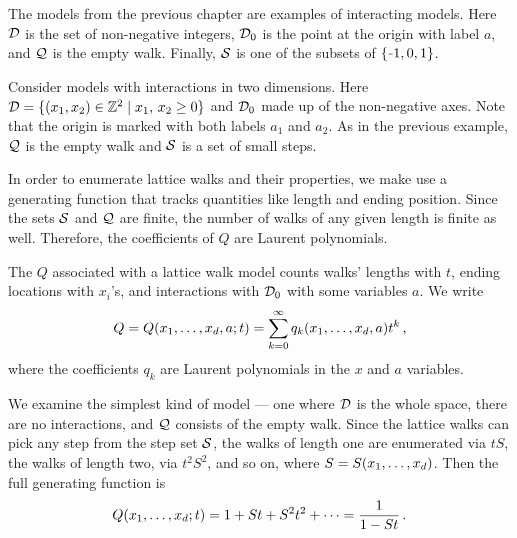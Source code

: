 \begin{exa} The \oneD models from the previous chapter are examples of \classic interacting models. Here $\mathcal{D}$ is the set of non-negative integers, $\mathcal{D}_0$ is the point at the origin with label $a$, and $\mathcal{Q}$ is the empty walk. Finally, $\mathcal{S}$ is one of the subsets of $\{\um 1, 0, 1\}$.
\end{exa}

\begin{exa} Consider \classic models with interactions in two dimensions. Here $\mathcal{D} = \{(x_1,x_2)\in \mathbb{Z}^2\mid x_1,\, x_2 \ge 0\}$ and $\mathcal{D}_0$ made up of the non-negative axes. Note that the origin is marked with both labels $a_1$ and $a_2$. As in the previous example, $\mathcal{Q}$ is the empty walk and $\mathcal{S}$ is a set of small steps.
\end{exa}

In order to enumerate lattice walks and their properties, we make use a generating function that tracks quantities like length and ending position. Since the sets $\mathcal{S}$ and $\mathcal{Q}$ are finite, the number of walks of any given length is finite as well. Therefore, the coefficients of $Q$ are Laurent polynomials.
\begin{defn} The  $Q$ associated with a lattice walk model counts walks' lengths with $t$, ending locations with $x_i$'s, and interactions with $\mathcal{D}_0$ with some variables $a$. We write
\begin{align}
	Q = Q(x_1,\ldots, x_d,a;t) = \sum_{k=0}^{\infty} q_k(x_1,\ldots, x_d, a)t^k\,,
\end{align}
where the coefficients $q_k$ are Laurent polynomials in the $x$ and $a$ variables. 
\end{defn}

\begin{exa} We examine the simplest kind of model --- one where $\mathcal{D}$ is the whole space, there are no interactions, and $\mathcal{Q}$ consists of the empty walk. Since the lattice walks can pick any step from the step set $\mathcal{S}$, the walks of length one are enumerated via $t S$, the walks of length two, via $t^2S^2$, and so on, where $S = S(x_1,\ldots, x_d)$. Then the full generating function is
\begin{align}
	Q(x_1,\ldots, x_d;t) = 1 + St + S^2t^2 + \cdots = \frac{1}{1-St}\,.
\end{align}
\end{exa}

